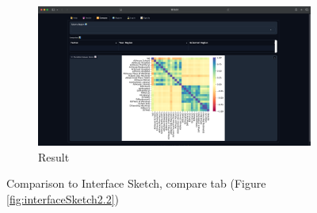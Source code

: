 \documentclass[12pt]{report}
\begin{document}
\begin{figure}[H]
\begin{subfigure}{.82\textwidth}
    \centering
    \includegraphics[width=\linewidth]{finalUIcompare.png}
    \caption{Result}
\end{subfigure}
\caption{Comparison to Interface Sketch, compare tab (Figure \ref{fig:interfaceSketch2.2})}\label{fig:compareSketch2}
\end{figure}
\end{document}
